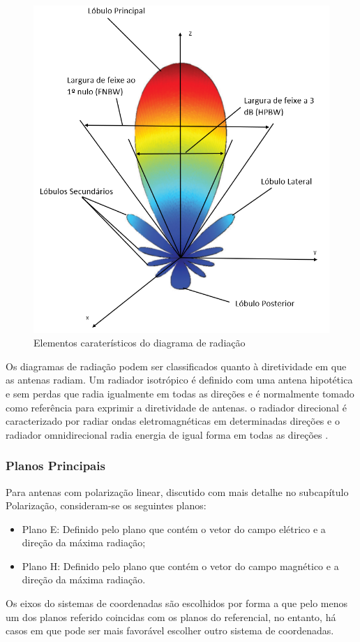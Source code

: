 \begin{figure}[h]
\centering
\includegraphics[scale=0.6]{chapters/ch3/assets/elem_carat_dg}
\decoRule
\caption[Elementos caraterísticos do diagrama de radiação]{Elementos caraterísticos do diagrama de radiação}
\label{fig:elem_carat_dg}
\end{figure}

Os diagramas de radiação podem ser classificados quanto à diretividade em que as antenas radiam. Um radiador isotrópico é definido com uma antena hipotética e sem perdas que radia igualmente em todas as direções e é normalmente tomado como referência para exprimir a diretividade de antenas. o radiador direcional é caracterizado por radiar ondas eletromagnéticas em determinadas direções e o radiador omnidirecional radia energia de igual forma em todas as direções \parencite{Balanis2016}.

\subsubsection*{Planos Principais}
Para antenas com polarização linear, discutido com mais detalhe no subcapítulo Polarização, consideram-se os seguintes planos:
\begin{itemize}
\item Plano E: Definido pelo plano que contém o vetor do campo elétrico e a direção da máxima radiação;
\item Plano H: Definido pelo plano que contém o vetor do campo magnético e a direção da máxima radiação.
\end{itemize}
Os eixos do sistemas de coordenadas são escolhidos por forma a que pelo menos um dos planos referido coincidas com os planos do referencial, no entanto, há casos em que pode ser mais favorável escolher outro sistema de coordenadas.


